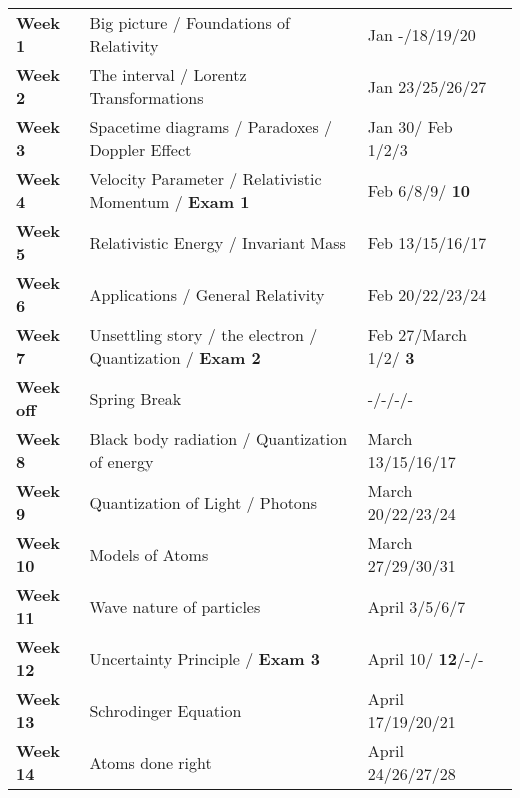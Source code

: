 \documentclass[margin,line]{res}
\newcommand\inRed[1]{{\color{red}  \textbf{#1}}}
\begin{document}
\begin{resume}
\begin{tabular}{llll}
\textbf{Week 1}   & Big picture / Foundations of Relativity        & Jan -/18/19/20 & \\
\textbf{Week 2}   & The interval / Lorentz Transformations         & Jan 23/25/26/27 & \\
\textbf{Week 3}   & Spacetime diagrams / Paradoxes / Doppler Effect        & Jan 30/ Feb 1/2/3 & \\
\textbf{Week 4}   & Velocity Parameter / Relativistic Momentum / \inRed{Exam 1}    & Feb 6/8/9/\inRed{10} & \\
\textbf{Week 5}   & Relativistic Energy / Invariant Mass                  & Feb 13/15/16/17 & \\
\textbf{Week 6}   & Applications / General Relativity                     & Feb 20/22/23/24 & \\
\textbf{Week 7}   & Unsettling story / the electron / Quantization / \inRed{Exam 2}       & Feb 27/March 1/2/ \inRed{3} & \\
\textbf{Week off} &  Spring Break                              & -/-/-/- & \\
\textbf{Week 8}   &  Black body radiation / Quantization of energy & March 13/15/16/17 & \\
\textbf{Week 9}   &  Quantization of Light  / Photons          & March 20/22/23/24 & \\
\textbf{Week 10}  &  Models of Atoms                                     & March 27/29/30/31 & \\
\textbf{Week 11}  &  Wave nature of particles                  & April 3/5/6/7 & \\
\textbf{Week 12}  &  Uncertainty Principle /  \inRed{Exam 3}           & April 10/\inRed{12}/-/- & \\
\textbf{Week 13}  &  Schrodinger Equation                      & April 17/19/20/21 & \\
\textbf{Week 14}  &  Atoms done right                          & April 24/26/27/28 & \\
\end{tabular}

\end{resume}
\end{document}
